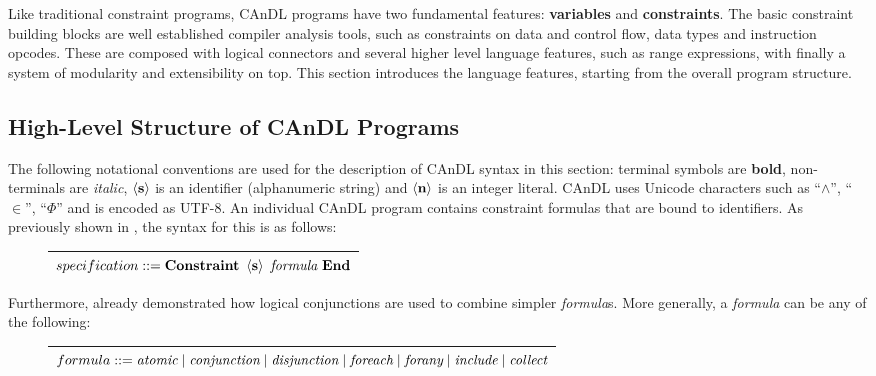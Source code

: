     Like traditional constraint programs, CAnDL programs have two
    fundamental features: \textbf{variables} and \textbf{constraints}.
    The basic constraint building blocks are well established compiler analysis
    tools, such as constraints on data and control flow, data types and
    instruction opcodes.
    These are composed with logical connectors and several higher level language
    features, such as range expressions, with finally a system of modularity and
    extensibility on top.
    This section introduces the language features, starting from the overall
    program structure.

\subsection{High-Level Structure of CAnDL Programs}

    The following notational conventions are used for the description of CAnDL
    syntax in this section:
    terminal symbols are {\bf bold}, non-terminals are {\it italic},
    $\left<\text{\bf s}\right>$ is an identifier (alphanumeric string) and
    $\left<\text{\bf n}\right>$ is an integer literal.
    CAnDL uses Unicode characters such as ``$\land$'', ``$\in$'', ``$\Phi$'' and
    is encoded as UTF-8.
    An individual CAnDL program contains constraint formulas that are
    bound to identifiers.
    As previously shown in , the syntax for this is as
    follows:
\begin{figure}[H]
\centering
\begin{tabular}{|c|}
    \hline
    $specification ::= \text{\bf Constraint}\ \left<\text{\bf s}\right>\ \text{\it formula}\ \text{\bf End}$\\
    \hline
\end{tabular}
\end{figure}

    \noindent
    Furthermore,  already demonstrated how logical
    conjunctions are used to combine simpler {\it formula}s.
    More generally, a {\it formula} can be any of the following:
\begin{figure}[H]
\centering
\begin{tabular}{|c|}
    \hline
    $formula ::= \text{\it atomic}\mid\text{\it conjunction}\mid\text{\it disjunction}\mid\text{\it foreach}\mid \text{\it forany}\mid\text{\it include}\mid\text{\it collect}$\\
    \hline
\end{tabular}
\end{figure}

